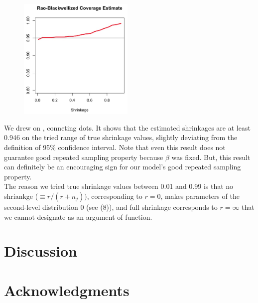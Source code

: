\documentclass[article]{jss}
\begin{document}
\begin{CodeChunk}
\end{CodeChunk}
\begin{figure}[h]
\begin{center}
\includegraphics[width = 5.5cm]{baseball4.png}
\end{center}
\end{figure}

We drew  on , conneting dots. It shows that the estimated shrinkages are at least 0.946 on the tried range of true shrinkage values, slightly deviating from the definition of 95\% confidence interval. Note that even this result does not guarantee good repeated sampling property because $\beta$ was fixed. But, this result can definitely be an encouraging sign for our model's good repeated sampling property. 
\\

The reason we tried true shrinkage values between 0.01 and 0.99 is that no shriankge ($\equiv r / (r + n_{j}))$, corresponding to $r=0$, makes parameters of the second-level distribution 0 (see (8)), and full shrinkage corresponds to $r=\infty$ that we cannot designate as an argument of  function.
\\

\section[Discussion]{Discussion}

\section[acknowledgments]{Acknowledgments}
\end{document}
